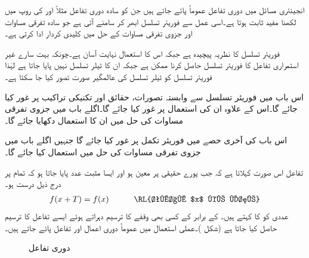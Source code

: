انجینئری مسائل میں دوری تفاعل عموماً پائے جاتے ہیں جن کو سادہ دوری تفاعل مثلاً  اور  کی روپ میں لکھنا مفید ثابت ہوتا ہے۔اسی عمل سے فوریئر تسلسل ابھر کر سامنے آتی ہے جو سادہ تفرقی مساوات اور جزوی تفرقی مساوات کے حل میں کلیدی کردار ادا کرتی ہے۔

فوریئر تسلسل کا نظریہ پیچیدہ ہے جبکہ اس کا استعمال نہایت آسان  ہے۔چونکہ بہت سارے غیر استمراری تفاعل کا فوریئر تسلسل حاصل کرنا ممکن ہے جبکہ ان کا ٹیلر تسلسل نہیں پایا جاتا ہے لہٰذا فوریئر تسلسل کو ٹیلر تسلسل کی عالمگیر صورت تصور کیا جا سکتا ہے۔

اس باب میں فوریئر تسلسل سے وابستہ تصورات، حقائق اور تکنیکی تراکیب پر غور کیا جائے گا۔اس کے علاوہ ان کی استعمال پر غور کیا جائے گا۔اگلے باب میں جزوی تفرقی مساوات کی حل میں ان کا استعمال دکھایا جائے گا۔

اس باب کی آخری حصے میں فوریئر تکمل پر غور کیا جائے گا جنہیں اگلے باب میں جزوی تفرقی مساوات کی حل میں استعمال کیا جائے گا۔

تفاعل  اس صورت  کہلاتا ہے کہ جب پورے حقیقی  پر  معین ہو اور ایسا مثبت عدد  پایا جاتا ہو کہ تمام  پر درج ذیل درست ہو۔
\begin{align}\label{مساوات_فوریئر_دوری_تعریف_الف}
f(x+T)=f(x)\quad \quad \quad \text{\RL{تمام $x$ کے لئے}}
\end{align} 
عددی  کو  کا  کہتے ہیں۔ کے برابر   کے کسی بھی وقفے کا ترسیم دہراتے ہوئے ایسے تفاعل کا ترسیم حاصل کیا جاتا ہے (شکل )۔عملی استعمال میں عموماً  دوری اعمال اور تفاعل  پائے جاتے ہیں۔
\begin{figure}
\centering
{}
\caption{دوری تفاعل}
\label{شکل_فوریئر_دوری_تفاعل}
\end{figure} 

